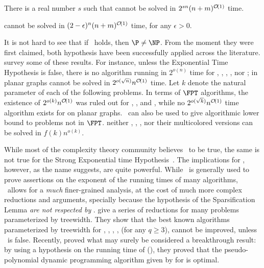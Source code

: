 \begin{class_definition*}
    There is a real number $s$ such that  cannot be solved in $2^{sn}(n + m)^{\mathcal{O}\!\left(1\right)}$ time.
\end{class_definition*}


\begin{class_definition*}
     cannot be solved in $(2 - \epsilon)^{n}(n + m)^{\mathcal{O}\!\left(1\right)}$ time, for any $\epsilon > 0$.
\end{class_definition*}


It is not hard to see that if \ETH\ holds, then $\P \neq \NP$.
From the moment they were first claimed, both hypothesis have been successfully applied across the literature.
\cite{eth_survey} survey some of these results.
For instance, unless the Exponential Time Hypothesis is false, there is no algorithm running in $2^{o(n)}$ time for , , , , nor ;
 in planar graphs cannot be solved in $2^{o(\sqrt{n})}n^{\mathcal{O}\!\left(1\right)}$ time.
Let $k$ denote the natural parameter of each of the following problems.
In terms of $\FPT$ algorithms, the existence of $2^{o(k)}n^{\mathcal{O}\!\left(1\right)}$ was ruled out for , , and , while no $2^{o(\sqrt{k})}n^{\mathcal{O}\!\left(1\right)}$ time algorithm exists for  on planar graphs.
\ETH\ can also be used to give algorithmic lower bound to problems not in $\FPT$.
\cite{eth_survey} neither , , , nor their multicolored versions can be solved in $f(k)n^{o(k)}$.

While most of the complexity theory community believes \ETH\ to be true, the same is not true for the Strong Exponential time Hypothesis~\citep{bad_seth}.
The implications for \SETH, however, as the name suggests, are quite powerful.
While \ETH\ is generally used to prove assertions on the exponent of the running times of many algorithms, \SETH\ allows for a \textit{much} finer-grained analysis, at the cost of much more complex reductions and arguments, specially because the hypothesis of the Sparsification Lemma \textit{are not respected by }.
\citep{seth_lokshtanov} give a series of reductions for many problems parameterized by treewidth.
They show that the best known algorithms parameterized by treewidth for , , , ,  (for any $q \geq 3$),  cannot be improved, unless \SETH\ is false.
Recently, \cite{seth_subset_sum} proved what may surely be considered a breakthrough result: by using a hypothesis on the running time of  (\SETH), they proved that the pseudo-polynomial dynamic programming algorithm given by \cite{bellman_dp} for  is optimal.


